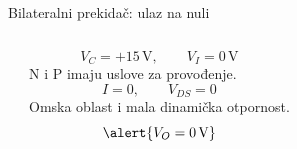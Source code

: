 \begin{frame}[label=09_3-s063]{Bilateralni prekidač: ulaz na nuli}
\begin{columns}[c,onlytextwidth]
\begin{center}

\end{center}
\[V_C=+15\,\mathrm V,\qquad V_I=0\,\mathrm V\]
N i P imaju uslove za provođenje.
\[I=0,\qquad V_{DS}=0\]
Omska oblast i mala dinamička otpornost.
\[\alert{V_O=0\,\mathrm V}\]
\end{columns}
\end{frame}

